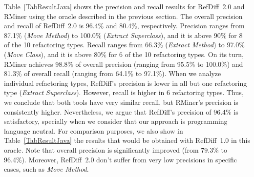 Table~\ref{TabResultJava} shows the precision and recall results for RefDiff~2.0 and RMiner using the oracle described in the previous section. The overall precision and recall of RefDiff~2.0 is 96.4\% and 80.4\%, respectively.
Precision ranges from 87.1\% (\emph{Move Method}) to 100.0\% (\emph{Extract Superclass}), and it is above 90\% for 8 of the 10 refactoring types.
Recall ranges from 66.3\% (\emph{Extract Method}) to 97.0\% (\emph{Move Class}), and it is above 80\% for 6 of the 10 refactoring types.
On its turn, RMiner achieves 98.8\% of overall precision (ranging from 95.5\% to 100.0\%) and 81.3\% of overall recall (ranging from 64.1\% to 97.1\%).
When we analyze individual refactoring types, RefDiff's precision is lower in all but one refactoring type (\emph{Extract Superclass}). However, recall is higher in 6 refactoring types.
Thus, we conclude that both tools have very similar recall, but RMiner's precision is consistently higher.
Nevertheless, we argue that RefDiff's precision of 96.4\% is satisfactory, specially when we consider that our approach is programming language neutral.
For comparison purposes, we also show in Table~\ref{TabResultJava} the results that would be obtained with RefDiff~1.0 in this oracle. Note that overall precision is significantly improved (from 79.3\% to 96.4\%). Moreover, RefDiff~2.0 don't suffer from very low precisions in specific cases, such as \emph{Move Method}.




